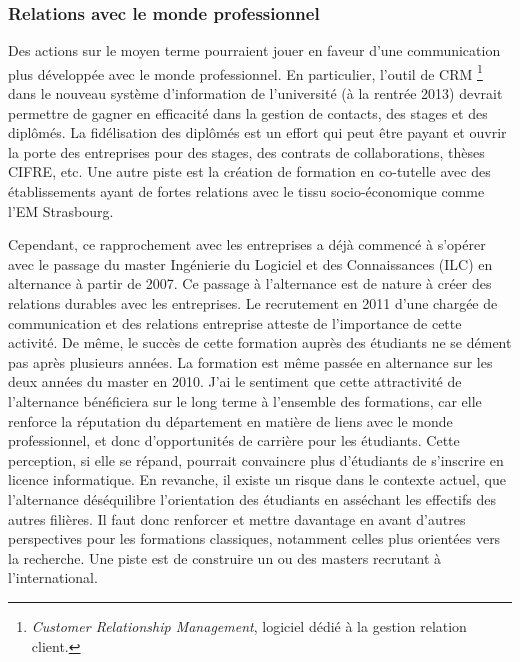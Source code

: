 \documentclass[11pt]{article}
\begin{document}

\subsubsection{Relations avec le monde professionnel}

Des actions sur le moyen terme pourraient jouer en faveur d'une communication 
plus développée avec le monde professionnel. En particulier, l'outil de CRM%
\footnote{\textit{Customer Relationship Management}, logiciel dédié à la 
gestion relation client.}
dans le nouveau système d'information de l'université (à la rentrée 2013) 
devrait permettre de gagner en efficacité dans la gestion de contacts, des 
stages et des diplômés. La fidélisation des diplômés est un effort qui peut 
être payant et ouvrir la porte des entreprises pour des stages, des contrats 
de collaborations, thèses CIFRE, etc. Une autre piste est la création de 
formation en co-tutelle avec des établissements ayant de fortes relations avec
le tissu socio-économique comme l'EM Strasbourg.

Cependant, ce rapprochement avec les entreprises a déjà commencé à s'opérer 
avec le passage du master Ingénierie du Logiciel et des Connaissances (ILC) en 
alternance à partir de 2007. Ce passage à l'alternance est de nature à créer 
des relations durables avec les entreprises. Le recrutement en 2011 d'une 
chargée de communication et des relations entreprise atteste de l'importance de 
cette activité. De même, le succès de cette formation auprès des étudiants ne 
se dément pas après plusieurs années. La formation est même passée en 
alternance sur les deux années du master en 2010. J'ai le sentiment que cette 
attractivité de l'alternance bénéficiera sur le long terme à l'ensemble des 
formations, car elle renforce la réputation du département en matière de liens 
avec le monde professionnel, et donc d'opportunités de carrière pour les 
étudiants. Cette perception, si elle se répand, pourrait convaincre plus 
d'étudiants de s'inscrire en licence informatique. En revanche, il existe un 
risque dans le contexte actuel, que l'alternance déséquilibre l'orientation des 
étudiants en asséchant les effectifs des autres filières. Il faut donc 
renforcer et mettre davantage en avant d'autres perspectives pour les 
formations classiques, notamment celles plus orientées vers la recherche. 
Une piste est de construire un ou des masters recrutant à l'international.
\end{document}
